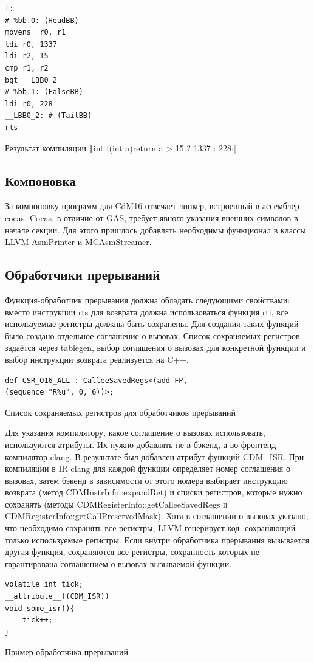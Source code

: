 \documentclass[a4paper,14pt]{extarticle}
\begin{document}
\begin{listing}[h!]
\begin{verbatim}
f:
# %bb.0: (HeadBB)
movens	r0, r1
ldi	r0, 1337
ldi	r2, 15
cmp	r1, r2
bgt	__LBB0_2
# %bb.1: (FalseBB)
ldi	r0, 228
__LBB0_2: # (TailBB)
rts
\end{verbatim}
\caption{Результат компиляции \texttt|int f(int a){return a > 15 ? 1337 : 228;}| }
\end{listing}

\subsection{Компоновка} 
За компоновку программ для CdM16 отвечает линкер, встроенный в ассемблер cocas.  Cocas, в отличие от GAS, требует явного указания внешних символов в начале секции. Для этого пришлось добавлять необходимы  функционал в классы LLVM AsmPrinter и MCAsmStreamer.

\subsection{Обработчики прерываний}
Функция-обработчик прерывания должна обладать следующими свойствами: вместо инструкции rts для возврата должна использоваться функция rti, все используемые регистры должны быть сохранены. Для создания таких функций было создано отдельное соглашение о вызовах. Список сохраняемых регистров задаётся через tablegen, выбор соглашения о вызовах для конкретной функции и выбор инструкции возврата реализуется на C++.
\begin{listing}[h!]
	\begin{verbatim}
def CSR_O16_ALL : CalleeSavedRegs<(add FP,
(sequence "R%u", 0, 6))>;
	\end{verbatim}
	\caption{Список сохраняемых регистров для обработчиков прерываний}
\end{listing}

Для указания компилятору, какое соглашение о вызовах использовать, используются атрибуты. Их нужно добавлять не в бэкенд, а во фронтенд - компилятор clang. В результате был добавлен атрибут функций CDM\_ISR. При компиляции в IR clang для каждой функции определяет номер соглашения о вызовах, затем бэкенд в зависимости от этого номера выбирает инструкцию возврата (метод CDMInstrInfo::expandRet) и списки регистров, которые нужно сохранять (методы CDMRegisterInfo::getCalleeSavedRegs и\\ CDMRegisterInfo::getCallPreservedMask). Хотя в соглашении о вызовах указано, что необходимо сохранять все регистры, LLVM генерирует код, сохраняющий только используемые регистры. Если внутри обработчика прерывания вызывается другая функция, сохраняются все регистры, сохранность которых не гарантирована соглашением о вызовах вызываемой функции.
\begin{listing}[h!]
	\begin{verbatim}
volatile int tick;
__attribute__((CDM_ISR))
void some_isr(){
	tick++;
}
	\end{verbatim}
	\caption{Пример обработчика прерываний}
\end{listing}
\end{document}
